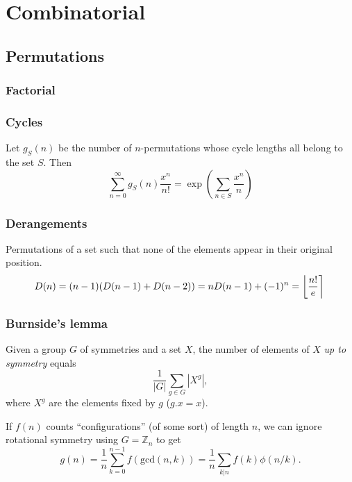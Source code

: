 \chapter{Combinatorial}

\section{Permutations}
	\subsection{Factorial}
		

	\subsection{Cycles}
		Let $g_S(n)$ be the number of $n$-permutations whose cycle lengths all belong to the set $S$. Then
		$$\sum_{n=0} ^\infty g_S(n) \frac{x^n}{n!} = \exp\left(\sum_{n\in S} \frac{x^n} {n} \right)$$

	\subsection{Derangements}
		Permutations of a set such that none of the elements appear in their original position.
		\[ \mkern-2mu D(n) = (n-1)(D(n-1)+D(n-2)) = n D(n-1)+(-1)^n = \left\lfloor\frac{n!}{e}\right\rceil \]

	\subsection{Burnside's lemma}
		Given a group $G$ of symmetries and a set $X$, the number of elements of $X$ \emph{up to symmetry} equals
		 \[ {\frac {1}{|G|}}\sum _{{g\in G}}|X^{g}|, \]
		 where $X^{g}$ are the elements fixed by $g$ ($g.x = x$).

		 If $f(n)$ counts ``configurations'' (of some sort) of length $n$, we can ignore rotational symmetry using $G = \mathbb Z_n$ to get
		 \[ g(n) = \frac 1 n \sum_{k=0}^{n-1}{f(\text{gcd}(n, k))} = \frac 1 n \sum_{k|n}{f(k)\phi(n/k)}. \]

